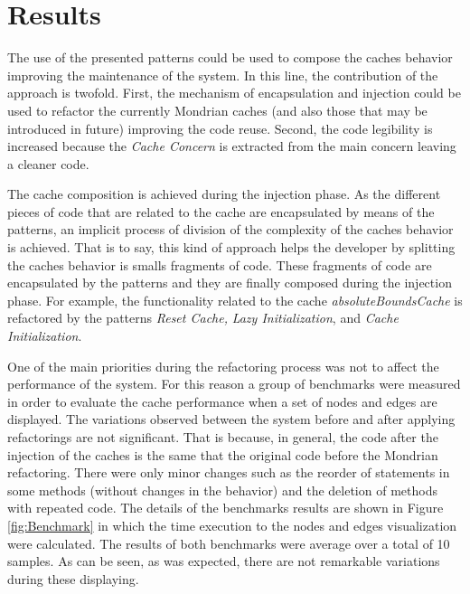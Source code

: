 \documentclass[preprint,10pt]{sigplanconf}
\newcommand{\seclabel}[1]{\label{sec:#1}}
\begin{document}
\section{Results}\seclabel{results}

The use of the presented patterns could be used to compose the caches
behavior improving the maintenance of the system. In this line, the
contribution of the approach is twofold. First, the mechanism of encapsulation
and injection could be used to refactor the currently Mondrian caches
(and also those that may be introduced in future) improving the code
reuse. Second, the code legibility is increased because the \emph{Cache
Concern} is extracted from the main concern leaving a cleaner code.

The cache composition is achieved during the injection phase. As the
different pieces of code that are related to the cache are encapsulated
by means of the patterns, an implicit process of division of the complexity
of the caches behavior is achieved. That is to say, this kind of approach
helps the developer by splitting the caches behavior is smalls fragments
of code. These fragments of code are encapsulated by the patterns
and they are finally composed during the injection phase. For example,
the functionality related to the cache \emph{absoluteBoundsCache}
is refactored by the patterns \emph{Reset Cache,} \emph{Lazy Initialization}, and \emph{Cache Initialization}.

One of the main priorities during the refactoring process was not to affect the performance of the system. 
For this reason a group of benchmarks were measured in order to evaluate the cache performance when a set of nodes and edges are displayed. The variations observed between the system before and after applying refactorings are not significant. That is because, in general, the code after the injection of the caches is the same that the original code before the Mondrian refactoring. There were only minor changes such as the reorder of statements in some methods (without changes in the behavior) and the deletion of methods with repeated code. The details of the benchmarks results are shown in Figure \ref{fig:Benchmark} in which the time execution to the nodes and edges visualization were calculated. The results of both benchmarks were average over a total of 10 samples. As can be seen, as was expected, there are not remarkable variations during these displaying.
\end{document}
